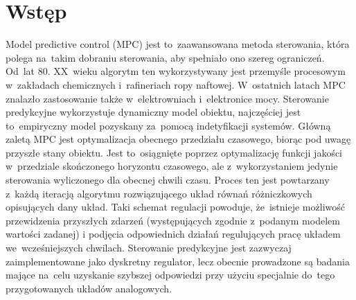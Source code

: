 \section{Wstęp}
Model predictive control (MPC) jest to~zaawansowana metoda sterowania, która
polega na~takim dobraniu sterowania, aby spełniało ono szereg ograniczeń. Od~lat 80. XX~wieku
algorytm ten wykorzystywany jest przemyśle procesowym w~zakładach chemicznych i~rafineriach 
ropy naftowej. W~ostatnich latach MPC znalazło zastosowanie także w~elektrowniach i~elektronice
mocy. Sterowanie predykcyjne wykorzystuje dynamiczny model obiektu, najczęściej jest to~empiryczny
model pozyskany za~pomocą indetyfikacji systemów. Główną zaletą MPC jest optymalizacja obecnego
przedziału czasowego, biorąc pod uwagę przyszłe stany obiektu. Jest to~osiągnięte poprzez
optymalizację funkcji jakości w~przedziale skończonego horyzontu czasowego, ale z~wykorzystaniem jedynie sterowania wyliczonego
dla obecnej chwili czasu. Proces ten jest powtarzany z~każdą iteracją algorytmu rozwiązującego
układ równań różniczkowych opisujących dany układ. Taki schemat regulacji powoduje, że~istnieje
możliwość przewidzenia przyszłych zdarzeń (występujących zgodnie z~podanym modelem wartości zadanej)
i podjęcia odpowiednich działań regulujących pracę układem we~wcześniejszych chwilach. Sterowanie
predykcyjne jest zazwyczaj zaimplementowane jako dyskretny regulator, lecz obecnie prowadzone są
badania mające na~celu uzyskanie szybszej odpowiedzi przy użyciu specjalnie do~tego przygotowanych
układów analogowych. \cite{mpc_book} \cite{mpc_pl} \cite{mpc_en}

